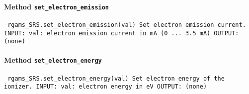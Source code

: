\paragraph{Method \texttt{set_electron_emission}}
\vspace{1ex}
\texttt{\newline
rgams_SRS.set_electron_emission(val)\newline
\newline
Set electron emission current.\newline
\newline
INPUT:\newline
val: electron emission current in mA (0 ... 3.5 mA)\newline
\newline
OUTPUT:\newline
(none)\newline
\newline
}

\paragraph{Method \texttt{set_electron_energy}}
\vspace{1ex}
\texttt{\newline
rgams_SRS.set_electron_energy(val)\newline
\newline
Set electron energy of the ionizer.\newline
\newline
INPUT:\newline
val: electron energy in eV\newline
\newline
OUTPUT:\newline
(none)\newline
\newline
}

